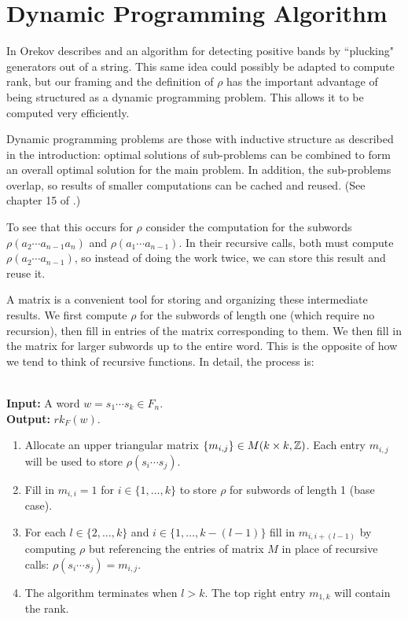 \documentclass[12pt]{thesis}
\begin{document}
\section{Dynamic Programming Algorithm}

In \cite{quasipositive-3-braids} Orekov describes and an algorithm
for detecting positive bands by ``plucking" generators out of a string.
This same idea could possibly be adapted to compute rank,
but our framing and the definition of $\rho$ has the important advantage of being structured as a dynamic programming problem.
This allows it to be computed very efficiently.

Dynamic programming problems are those with inductive structure
as described in the introduction:
optimal solutions of sub-problems can be combined to form
an overall optimal solution for the main problem. In addition, the sub-problems overlap,
so results of smaller computations can be cached and reused.
(See chapter 15 of \cite{clrs}.)

To see that this occurs for $\rho$
consider the computation for the subwords $\rho( a_{2} \cdots a_{n - 1} a_{n} )$ and $\rho(  a_{1} \cdots a_{n - 1} )$.
In their recursive calls, both must compute $\rho( a_{2} \cdots a_{n - 1})$, so instead of doing
the work twice, we can store this result and reuse it. 

A matrix is a convenient tool for storing and organizing these intermediate results.
We first compute $\rho$ for the subwords
of length one (which require no recursion), then fill in entries of the matrix corresponding to them.
We then fill in the matrix for larger subwords up to the entire word.
This is the opposite of how we tend to think of recursive functions.
In detail, the process is: 

\begin{algorithm}
    ~ \\
    \textbf{Input:} A word $w = s_{1} \cdots s_{k} \in F_{n}$.
    ~\\
    \textbf{Output:} $rk_{F}(w)$. 

\begin{enumerate}
    \item Allocate an upper triangular matrix $\{ m_{i, j} \} \in M(k \times k, \mathbb{Z})$. 
          Each entry $m_{i, j}$ will be used to store $\rho(s_{i} \cdots s_{j})$.

    \item Fill in $m_{i, i} = 1$ for $i \in \{ 1, \ldots, k \}$
           to store $\rho$ for subwords of length 1 (base case).

      \item For each $l \in \{ 2, \ldots, k \}$ and $i \in \{ 1, \ldots, k - (l - 1) \}$
           fill in $m_{i, i + (l - 1)}$ by computing $\rho$ but referencing
           the entries of matrix $M$ in place of recursive calls: $\rho(s_{i} \cdots s_{j}) = m_{i, j}$.
     
    \item The algorithm terminates when $l > k$.
          The top right entry $m_{1, k}$ will contain the rank.
\end{enumerate}

\end{algorithm}
\end{document}
